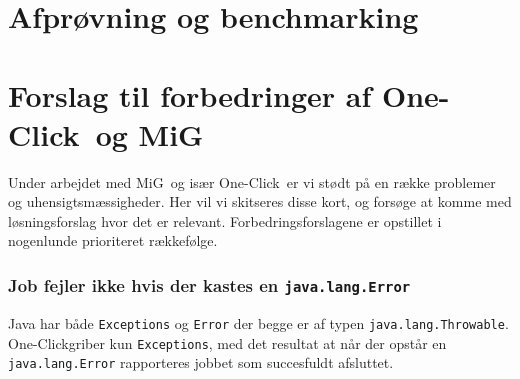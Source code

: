 \documentclass[final,a4paper,11pt]{article}
\newcommand{\mig}{MiG}
\newcommand{\oc}{One-Click}
\begin{document}


\section{Afprøvning og benchmarking}\label{benchmarks}





\section{Forslag til forbedringer af \oc\ og \mig}\label{forbedringer}

Under arbejdet med \mig\ og især \oc\ er vi stødt på en række problemer og uhensigtsmæssigheder. Her vil vi skitseres disse kort, og forsøge at komme med løsningsforslag hvor det er relevant. Forbedringsforslagene er opstillet i nogenlunde prioriteret rækkefølge.

\subsubsection*{Job fejler ikke hvis der kastes en \texttt{java.lang.Error}}
Java har både \texttt{Exceptions} og \texttt{Error} der begge er af typen \texttt{java.lang.Throwable}. \oc griber kun \texttt{Exceptions}, med det resultat at når der opstår en \texttt{java.lang.Error} rapporteres jobbet som succesfuldt afsluttet. 
\end{document}
